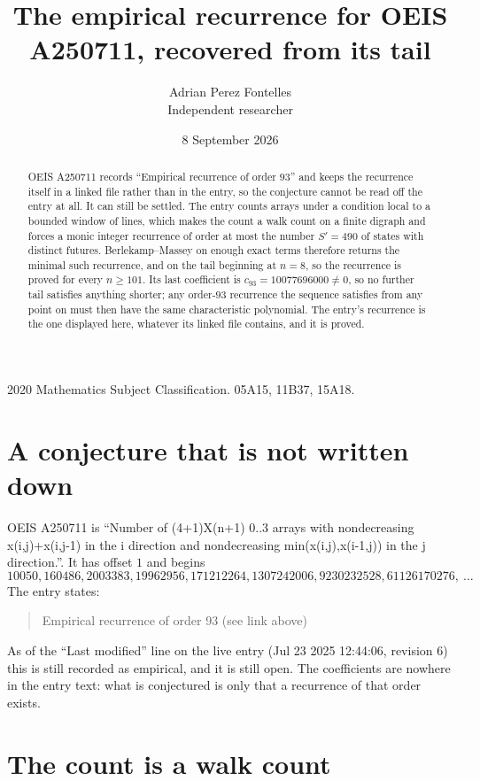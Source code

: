 \documentclass[11pt,a4paper]{article}
\title{The empirical recurrence for OEIS A250711, recovered from its tail}
\author{Adrian Perez Fontelles\\ \small Independent researcher}
\date{8 September 2026}
\theoremstyle{plain}
\theoremstyle{definition}
\begin{document}
\maketitle

\begin{abstract}
OEIS A250711 records ``Empirical recurrence of order $93$'' and keeps the recurrence itself in
a linked file rather than in the entry, so the conjecture cannot be read off the entry at all.
It can still be settled. The entry counts arrays under a condition local to a bounded window of
lines, which makes the count a walk count on a finite digraph and forces a monic integer
recurrence of order at most the number $S'=490$ of states with distinct futures. Berlekamp--Massey on
enough exact terms therefore returns the minimal such recurrence, and on the tail beginning at $n=8$, so the recurrence is proved for every $n\ge101$.
Its last coefficient is $c_{93}=10077696000\neq0$, so no further tail satisfies anything
shorter; any order-$93$ recurrence the sequence satisfies from any point on must then have
the same characteristic polynomial. The entry's recurrence is the one displayed here, whatever
its linked file contains, and it is proved.
\end{abstract}

\noindent\small 2020 Mathematics Subject Classification. 05A15, 11B37, 15A18.\normalsize

\section{A conjecture that is not written down}

OEIS A250711 is ``Number of (4+1)X(n+1) 0..3 arrays with nondecreasing x(i,j)+x(i,j-1) in the i direction and nondecreasing min(x(i,j),x(i-1,j)) in the j direction.''. It has offset $1$ and begins
\[
10050, 160486, 2003383, 19962956, 171212264, 1307242006, 9230232528, 61126170276,\ \dots
\]
The entry states:
\begin{quote}
Empirical recurrence of order 93 (see link above)
\end{quote}
As of the ``Last modified'' line on the live entry (Jul 23 2025 12:44:06, revision 6)
this is still recorded as empirical, and it is still open. The coefficients are nowhere in the
entry text: what is conjectured is only that a recurrence of that order exists.

\section{The count is a walk count}
\end{document}
